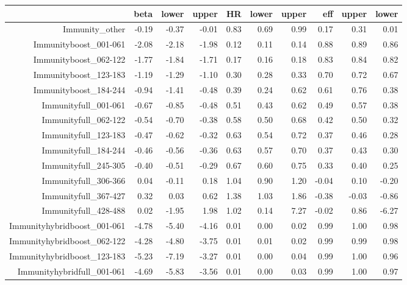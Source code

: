 \begin{table}[ht]
\centering
\begin{tabular}{rrrrrrrrrr}
  \hline
 & beta & lower & upper & HR & lower & upper & eff & upper & lower \\ 
  \hline
Immunity\_other & -0.19 & -0.37 & -0.01 & 0.83 & 0.69 & 0.99 & 0.17 & 0.31 & 0.01 \\ 
  Immunityboost\_001-061 & -2.08 & -2.18 & -1.98 & 0.12 & 0.11 & 0.14 & 0.88 & 0.89 & 0.86 \\ 
  Immunityboost\_062-122 & -1.77 & -1.84 & -1.71 & 0.17 & 0.16 & 0.18 & 0.83 & 0.84 & 0.82 \\ 
  Immunityboost\_123-183 & -1.19 & -1.29 & -1.10 & 0.30 & 0.28 & 0.33 & 0.70 & 0.72 & 0.67 \\ 
  Immunityboost\_184-244 & -0.94 & -1.41 & -0.48 & 0.39 & 0.24 & 0.62 & 0.61 & 0.76 & 0.38 \\ 
  Immunityfull\_001-061 & -0.67 & -0.85 & -0.48 & 0.51 & 0.43 & 0.62 & 0.49 & 0.57 & 0.38 \\ 
  Immunityfull\_062-122 & -0.54 & -0.70 & -0.38 & 0.58 & 0.50 & 0.68 & 0.42 & 0.50 & 0.32 \\ 
  Immunityfull\_123-183 & -0.47 & -0.62 & -0.32 & 0.63 & 0.54 & 0.72 & 0.37 & 0.46 & 0.28 \\ 
  Immunityfull\_184-244 & -0.46 & -0.56 & -0.36 & 0.63 & 0.57 & 0.70 & 0.37 & 0.43 & 0.30 \\ 
  Immunityfull\_245-305 & -0.40 & -0.51 & -0.29 & 0.67 & 0.60 & 0.75 & 0.33 & 0.40 & 0.25 \\ 
  Immunityfull\_306-366 & 0.04 & -0.11 & 0.18 & 1.04 & 0.90 & 1.20 & -0.04 & 0.10 & -0.20 \\ 
  Immunityfull\_367-427 & 0.32 & 0.03 & 0.62 & 1.38 & 1.03 & 1.86 & -0.38 & -0.03 & -0.86 \\ 
  Immunityfull\_428-488 & 0.02 & -1.95 & 1.98 & 1.02 & 0.14 & 7.27 & -0.02 & 0.86 & -6.27 \\ 
  Immunityhybridboost\_001-061 & -4.78 & -5.40 & -4.16 & 0.01 & 0.00 & 0.02 & 0.99 & 1.00 & 0.98 \\ 
  Immunityhybridboost\_062-122 & -4.28 & -4.80 & -3.75 & 0.01 & 0.01 & 0.02 & 0.99 & 0.99 & 0.98 \\ 
  Immunityhybridboost\_123-183 & -5.23 & -7.19 & -3.27 & 0.01 & 0.00 & 0.04 & 0.99 & 1.00 & 0.96 \\ 
  Immunityhybridfull\_001-061 & -4.69 & -5.83 & -3.56 & 0.01 & 0.00 & 0.03 & 0.99 & 1.00 & 0.97 \\ 

\end{tabular}
\end{table}
